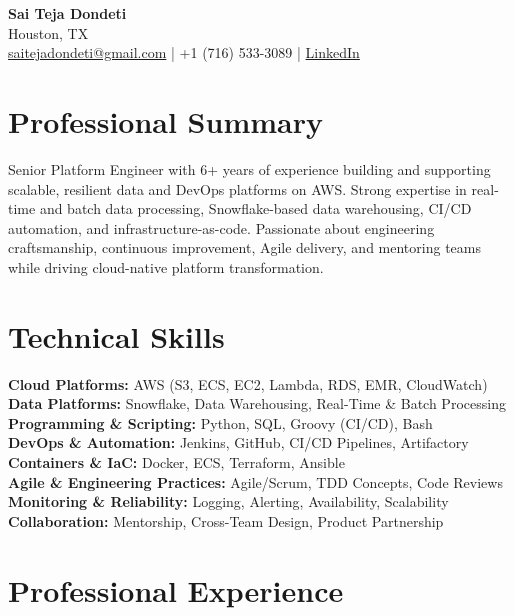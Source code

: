 \documentclass[10pt]{article}
\begin{document}
\begin{center}
    {\LARGE \textbf{Sai Teja Dondeti}} \\
    \vspace{2pt}
    Houston, TX \\
    \href{mailto:saitejadondeti@gmail.com}{saitejadondeti@gmail.com} \;|\;
    +1 (716) 533-3089 \;|\;
    \href{https://www.linkedin.com/in/sai-teja-dondeti/}{LinkedIn}
\end{center}

\section*{Professional Summary}
Senior Platform Engineer with 6+ years of experience building and supporting scalable, resilient data and DevOps platforms on AWS. Strong expertise in real-time and batch data processing, Snowflake-based data warehousing, CI/CD automation, and infrastructure-as-code. Passionate about engineering craftsmanship, continuous improvement, Agile delivery, and mentoring teams while driving cloud-native platform transformation.

\section*{Technical Skills}

\textbf{Cloud Platforms:} AWS (S3, ECS, EC2, Lambda, RDS, EMR, CloudWatch) \\
\textbf{Data Platforms:} Snowflake, Data Warehousing, Real-Time \& Batch Processing \\
\textbf{Programming \& Scripting:} Python, SQL, Groovy (CI/CD), Bash \\
\textbf{DevOps \& Automation:} Jenkins, GitHub, CI/CD Pipelines, Artifactory \\
\textbf{Containers \& IaC:} Docker, ECS, Terraform, Ansible \\
\textbf{Agile \& Engineering Practices:} Agile/Scrum, TDD Concepts, Code Reviews \\
\textbf{Monitoring \& Reliability:} Logging, Alerting, Availability, Scalability \\
\textbf{Collaboration:} Mentorship, Cross-Team Design, Product Partnership

\section*{Professional Experience}
\end{document}
